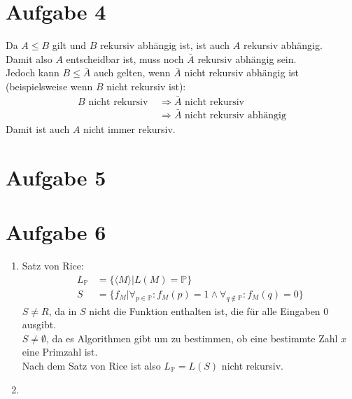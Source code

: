 \documentclass[a4paper,11pt]{scrartcl}
\begin{document}
	\section*{Aufgabe 4}
	Da $A \leq B$ gilt und $B$ rekursiv abhängig ist, ist auch $A$ rekursiv abhängig.\\
	Damit also $A$ entscheidbar ist, muss noch $\bar{A}$ rekursiv abhängig sein.\\
	Jedoch kann $B \leq \bar{A}$ auch gelten, wenn $\bar{A}$ nicht rekursiv abhängig ist (beispielsweise wenn $B$ nicht rekursiv ist):
	\begin{align*}
	B \text{ nicht rekursiv } 	&\Rightarrow \bar{A} \text{ nicht rekursiv} \\
								&\Rightarrow \bar{A} \text{ nicht rekursiv abhängig}
	\end{align*}
	Damit ist auch $A$ nicht immer rekursiv.
	
		
	\section*{Aufgabe 5}
	
	
	\section*{Aufgabe 6}
	\begin{enumerate}[label=\alph*)]
	\item	Satz von Rice:
			\begin{align*}
			L_{\mathbb{P}} &= \{\langle M \rangle \vert L(M) = \mathbb{P}\} \\
			S &= \{f_M \vert \forall_{p\in\mathbb{P}}: f_M(p) = 1 \land \forall_{q\not\in\mathbb{P}}: f_M(q) = 0\}		
			\end{align*}
			$S \neq R$, da in $S$ nicht die Funktion enthalten ist, die für alle Eingaben $0$ ausgibt.\\
			$S \neq \emptyset$, da es Algorithmen gibt um zu bestimmen, ob eine bestimmte Zahl $x$ eine Primzahl ist.\\
			Nach dem Satz von Rice ist also $L_{\mathbb{P}} = L(S)$ nicht rekursiv.
	\item	
	\end{enumerate}
	
\newpage
	
\end{document}
